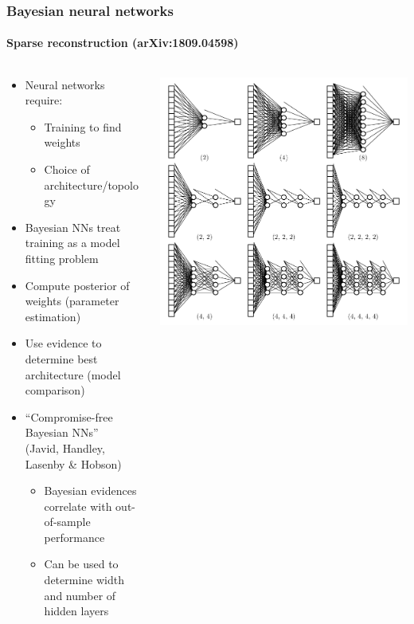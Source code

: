 \documentclass[%
]{beamer}
\begin{document}
\begin{frame}
    \frametitle{Bayesian neural networks}
    \framesubtitle{Sparse reconstruction (arXiv:1809.04598)}

    \begin{columns}
        \begin{column}{0.6\textwidth}
            \begin{itemize}
                \item Neural networks require:
                    \begin{itemize}
                        \item Training to find weights
                        \item Choice of architecture/topology
                    \end{itemize}
                \item Bayesian NNs treat training as a model fitting problem
                \item Compute posterior of weights (parameter estimation)
                \item Use evidence to determine best architecture (model comparison)
                \item ``Compromise-free Bayesian NNs''\\ (Javid, Handley, Lasenby \& Hobson)
                    \begin{itemize}
                        \item Bayesian evidences correlate with out-of-sample performance
                        \item Can be used to determine width and number of hidden layers
                    \end{itemize}
            \end{itemize}
        \end{column}
        \begin{column}{0.4\textwidth}
            \includegraphics[width=\textwidth]{./figures/Colored_neural_network.pdf}

\end{column}
\end{columns}
\end{frame}
\end{document}
